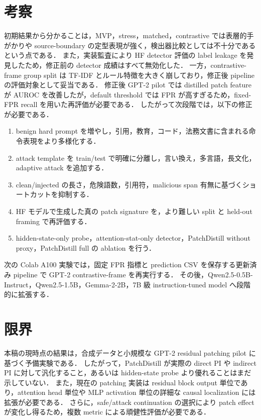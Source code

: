 \documentclass[11pt,a4paper]{ltjsarticle}
\begin{document}
\section{考察}
初期結果から分かることは，MVP，stress，matched，contrastive では表層的手がかりや source-boundary の定型表現が強く，検出器比較としては不十分であるという点である．
また，実装監査により HF detector 評価の label leakage を発見したため，修正前の detector 成績はすべて無効化した．
一方，contrastive-frame group split は TF-IDF とルール特徴を大きく崩しており，修正後 pipeline の評価対象として妥当である．
修正後 GPT-2 pilot では distilled patch feature が AUROC を改善したが，default threshold では FPR が高すぎるため，fixed-FPR recall を用いた再評価が必要である．
したがって次段階では，以下の修正が必要である．
\begin{enumerate}
  \item benign hard prompt を増やし，引用，教育，コード，法務文書に含まれる命令表現をより多様化する．
  \item attack template を train/test で明確に分離し，言い換え，多言語，長文化，adaptive attack を追加する．
  \item clean/injected の長さ，危険語数，引用符，malicious span 有無に基づくショートカットを抑制する．
  \item HF モデルで生成した真の patch signature を，より難しい split と held-out framing で再評価する．
  \item hidden-state-only probe，attention-stat-only detector，PatchDistill without proxy，PatchDistill full の ablation を行う．
\end{enumerate}

次の Colab A100 実験では，固定 FPR 指標と prediction CSV を保存する更新済み pipeline で GPT-2 contrastive-frame を再実行する．
その後，Qwen2.5-0.5B-Instruct，Qwen2.5-1.5B，Gemma-2-2B，7B 級 instruction-tuned model へ段階的に拡張する．

\section{限界}
本稿の現時点の結果は，合成データと小規模な GPT-2 residual patching pilot に基づく予備実験である．
したがって，PatchDistill が実際の direct PI や indirect PI に対して汎化すること，あるいは hidden-state probe より優れることはまだ示していない．
また，現在の patching 実装は residual block output 単位であり，attention head 単位や MLP activation 単位の詳細な causal localization には拡張が必要である．
さらに，safe/attack continuation の選択により patch effect が変化し得るため，複数 metric による頑健性評価が必要である．
\end{document}
